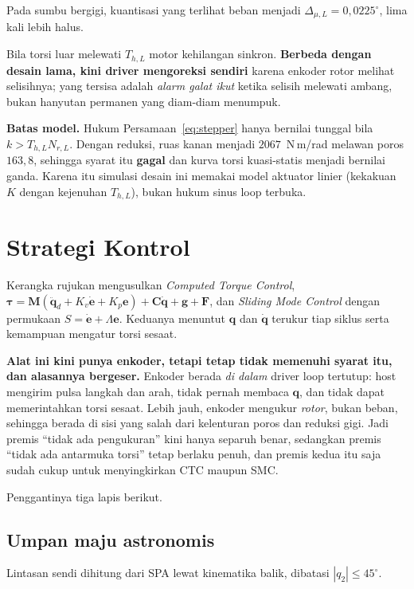 \documentclass[11pt,a4paper]{article}
\newcommand{\degg}{^\circ}
\begin{document}
Pada sumbu bergigi, kuantisasi yang terlihat beban menjadi $\Delta_{\mu,L} = 0{,}0225\degg$, lima kali
lebih halus.

Bila torsi luar melewati $T_{h,L}$ motor kehilangan sinkron. \textbf{Berbeda dengan desain lama, kini
driver mengoreksi sendiri} karena enkoder rotor melihat selisihnya; yang tersisa adalah \emph{alarm galat
ikut} ketika selisih melewati ambang, bukan hanyutan permanen yang diam-diam menumpuk.

\textbf{Batas model.} Hukum Persamaan~\eqref{eq:stepper} hanya bernilai tunggal bila $k > T_{h,L} N_{r,L}$.
Dengan reduksi, ruas kanan menjadi $2067$~N\,m/rad melawan poros $163{,}8$, sehingga syarat itu
\textbf{gagal} dan kurva torsi kuasi-statis menjadi bernilai ganda. Karena itu simulasi desain ini memakai
model aktuator linier (kekakuan $K$ dengan kejenuhan $T_{h,L}$), bukan hukum sinus loop terbuka.

\section{Strategi Kontrol}

Kerangka rujukan mengusulkan \emph{Computed Torque Control},
$\bm{\tau} = \bm{M}(\ddot{\bm{q}}_d + K_v\dot{\bm{e}} + K_p\bm{e}) + \bm{C}\dot{\bm{q}} + \bm{g} + \bm{F}$,
dan \emph{Sliding Mode Control} dengan permukaan $S = \dot{\bm{e}} + \Lambda\bm{e}$. Keduanya menuntut
$\bm{q}$ dan $\dot{\bm{q}}$ terukur tiap siklus serta kemampuan mengatur torsi sesaat.

\textbf{Alat ini kini punya enkoder, tetapi tetap tidak memenuhi syarat itu, dan alasannya bergeser.}
Enkoder berada \emph{di dalam} driver loop tertutup: host mengirim pulsa langkah dan arah, tidak pernah
membaca $\bm{q}$, dan tidak dapat memerintahkan torsi sesaat. Lebih jauh, enkoder mengukur \emph{rotor},
bukan beban, sehingga berada di sisi yang salah dari kelenturan poros dan reduksi gigi. Jadi premis
``tidak ada pengukuran'' kini hanya separuh benar, sedangkan premis ``tidak ada antarmuka torsi'' tetap
berlaku penuh, dan premis kedua itu saja sudah cukup untuk menyingkirkan CTC maupun SMC.

Penggantinya tiga lapis berikut.

\subsection{Umpan maju astronomis}

Lintasan sendi dihitung dari SPA lewat kinematika balik, dibatasi $|q_2| \le 45\degg$.
\end{document}
